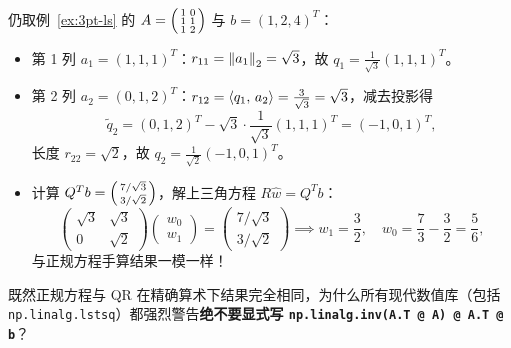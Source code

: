 \begin{example}\label{ex:3pt-qr}
仍取例~\ref{ex:3pt-ls} 的 $A = \begin{psmallmatrix} 1 & 0 \\ 1 & 1 \\ 1 & 2 \end{psmallmatrix}$ 与 $b = (1, 2, 4)^T$：
\begin{itemize}
  \item 第 1 列 $a_1 = (1, 1, 1)^T$：$r_{11} = \left\|a_1\right\|_2 = \sqrt{3}$，故 $q_1 = \frac{1}{\sqrt{3}}(1, 1, 1)^T$。
  \item 第 2 列 $a_2 = (0, 1, 2)^T$：$r_{12} = \left\langle q_1,\, a_2 \right\rangle = \frac{3}{\sqrt{3}} = \sqrt{3}$，减去投影得
  \[
  \tilde{q}_2 = (0, 1, 2)^T - \sqrt{3}\cdot\frac{1}{\sqrt{3}}(1, 1, 1)^T = (-1, 0, 1)^T,
  \]
  长度 $r_{22} = \sqrt{2}$，故 $q_2 = \frac{1}{\sqrt{2}}(-1, 0, 1)^T$。
  \item 计算 $Q^T b = \begin{psmallmatrix} 7/\sqrt{3} \\ 3/\sqrt{2} \end{psmallmatrix}$，解上三角方程 $R\hat{w} = Q^T b$：
  \[
  \begin{pmatrix} \sqrt{3} & \sqrt{3} \\ 0 & \sqrt{2} \end{pmatrix}\begin{pmatrix} w_0 \\ w_1 \end{pmatrix}
  = \begin{pmatrix} 7/\sqrt{3} \\ 3/\sqrt{2} \end{pmatrix}
  \implies w_1 = \frac{3}{2}, \quad w_0 = \frac{7}{3} - \frac{3}{2} = \frac{5}{6},
  \]
  与正规方程手算结果一模一样！
\end{itemize}
\end{example}

既然正规方程与 QR 在精确算术下结果完全相同，为什么所有现代数值库（包括 \texttt{np.linalg.lstsq}）都强烈警告\textbf{绝不要显式写 \texttt{np.linalg.inv(A.T @ A) @ A.T @ b}}？

